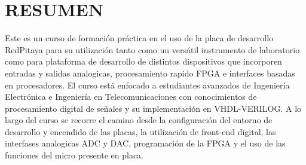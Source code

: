 \documentclass[11pt]{exam}
\begin{document}
%
%
%

\section{RESUMEN}
Este es un curso de formación práctica en el uso de la placa de desarrollo
RedPitaya para su utilización tanto como un versátil instrumento de laboratorio
como para plataforma de desarrollo de distintos dispositivos que incorporen
entradas y salidas analogicas, procesamiento rapido FPGA e interfaces basadas en
procesadores. El curso está enfocado a estudiantes avanzados de Ingeniería
Electrónica e Ingeniería en Telecomunicaciones con conocimientos de
procesamiento digital de señales y su implementación en  VHDL-VERILOG. A lo
largo del curso se recorre el camino desde la configuración del entorno de
desarrollo y encendido de las placas, la utilización de front-end digital, las
interfases analogicas ADC y DAC, programación de la FPGA y el uso de las
funciones del micro presente en placa.
\end{document}
